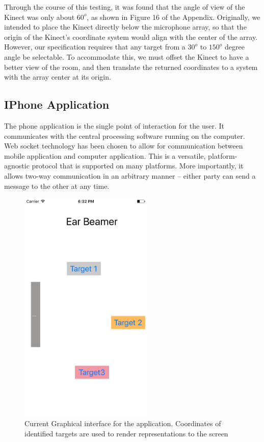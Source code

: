 \documentclass[10pt,journal,compsoc]{IEEEtran}
\begin{document}
Through the course of this testing, it was found that the angle of view of the Kinect was only about $60^o$, as shown in Figure 16 of the Appendix. Originally, we intended to place the Kinect directly below the microphone array, so that the origin of the Kinect’s coordinate system would align with the center of the array. However, our specification requires that any target from a $30^o$ to $150^o$ degree angle be selectable. To accommodate this, we must offset the Kinect to have a better view of the room, and then translate the returned coordinates to a system with the array center at its origin.

\subsection{IPhone Application}

The phone application is the single point of interaction for the user.  It communicates with the central processing software running on the computer.  Web socket technology has been chosen to allow for communication between mobile application and computer application.  This is a versatile, platform-agnostic protocol that is supported on many platforms.  More importantly, it allows two-way communication in an arbitrary manner – either party can send a message to the other at any time.

\begin{figure}
    \centering
    \includegraphics[width=2.5in]{app}
    \caption{Current Graphical interface for the application. Coordinates of identified targets are used to render representations to the screen}
    \label{fig:my_label}
\end{figure}
\end{document}
